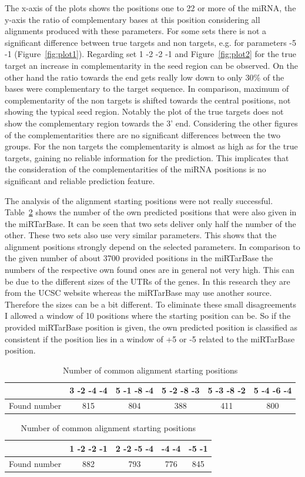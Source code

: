 \documentclass[12pt]{article}
\begin{document}
The x-axis of the plots shows the positions one to 22 or more of the miRNA, the y-axis the ratio of complementary bases at this position considering all alignments produced with these parameters. For some sets there is not a significant difference between true targets and non targets, e.g. for parameters -5 -1 (Figure~\ref{fig:plot1}). Regarding set 1 -2 -2 -1 and Figure~\ref{fig:plot2} for the true target an increase in complementarity in the seed region can be observed. On the other hand the ratio towards the end gets really low down to only 30\% of the bases were complementary to the target sequence. In comparison, maximum of complementarity of the non targets is shifted towards the central positions, not showing the typical seed region. Notably the plot of the true targets does not show the complementary region towards the 3' end. Considering the other figures of the complementarities there are no significant differences between the two groups. For the non targets the complementarity is almost as high as for the true targets, gaining no reliable information for the prediction. This implicates that the consideration of the complementarities of the miRNA positions is no significant and reliable prediction feature.

The analysis of the alignment starting positions were not really successful. Table~\ref{tab:positions} shows the number of the own predicted positions that were also given in the miRTarBase. It can be seen that two sets deliver only half the number of the other. These two sets also use very similar parameters. This shows that the alignment positions strongly depend on the selected parameters. In comparison to the given number of about 3700 provided positions in the miRTarBase the numbers of the respective own found ones are in general not very high. This can be due to the different sizes of the UTRs of the genes. In this research they are from the UCSC website whereas the miRTarBase may use another source. Therefore the sizes can be a bit different. To eliminate these small disagreements I allowed a window of 10 positions where the starting position can be. So if the provided miRTarBase position is given, the own predicted position is classified as consistent if the position lies in a window of +5 or -5 related to the miRTarBase position. 


\begin{table}
\label{tab:positions}
\caption{Number of common alignment starting positions}
\vspace{0.3cm}
\begin{tabular}{c||c|c|c|c|c} 
& 3 -2 -4 -4 & 5 -1 -8 -4 & 5 -2 -8 -3 & 5 -3 -8 -2 & 5 -4 -6 -4  \\
\hline\hline
Found number & 815 & 804 & 388 & 411 & 800\\
\hline
\end{tabular}
\vspace{0.5cm}

\begin{tabular}{c||c|c|c|c}
& 1 -2 -2 -1 & 2 -2 -5 -4 & -4 -4 & -5 -1 \\
\hline\hline
Found number & 882 & 793 & 776 & 845  \\
\hline
\end{tabular}
\end{table}
\end{document}
